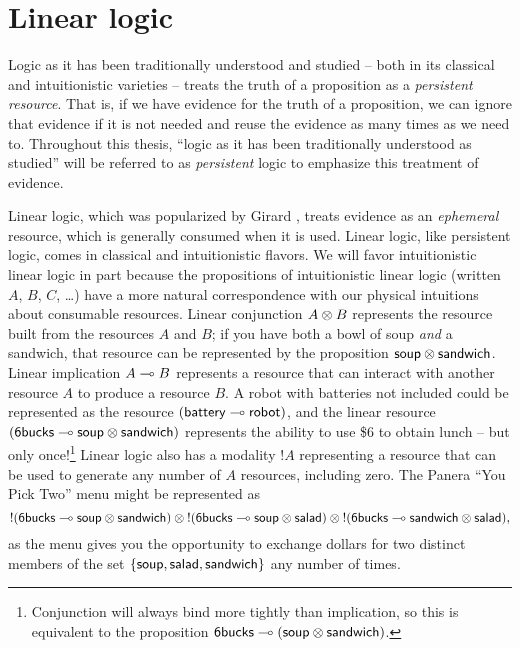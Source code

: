 
\chapter{Linear logic}

Logic as it has been traditionally understood and studied -- both in
its classical and intuitionistic varieties -- treats the truth of a
proposition as a {\it persistent resource}. That is, if we have
evidence for the truth of a proposition, we can ignore that evidence
if it is not needed and reuse the evidence as many times as we need
to. Throughout this thesis, ``logic as it has been traditionally
understood as studied'' will be referred to as {\it persistent} logic
to emphasize this treatment of evidence. 

Linear logic, which was popularized by Girard \cite{girard87linear},
treats evidence as an {\it ephemeral} resource, which is generally
consumed when it is used. Linear logic, like persistent logic, comes
in classical and intuitionistic flavors. We will favor intuitionistic
linear logic in part because the propositions of intuitionistic linear
logic (written $A$, $B$, $C$, \ldots) have a more natural
correspondence with our physical intuitions about consumable
resources. Linear conjunction $A \otimes B$ represents the resource
built from the resources $A$ and $B$; if you have both a bowl of soup
{\it and} a sandwich, that resource can be represented by the
proposition ${\sf soup} \otimes {\sf sandwich}$. Linear implication $A
\multimap B$ represents a resource that can interact with another
resource $A$ to produce a resource $B$. A robot with batteries not
included could be represented as the resource $({\sf battery} \multimap
{\sf robot})$, and the linear resource $({\sf 6bucks} \multimap {\sf
  soup} \otimes {\sf sandwich})$ represents the ability to use \$6 to
obtain lunch -- but only once!\footnote{Conjunction will always bind
  more tightly than implication, so this is equivalent to the
  proposition ${\sf 6bucks} \multimap ({\sf soup} \otimes {\sf
    sandwich})$.} Linear logic also has a modality ${!}A$ representing
a resource that can be used to generate any number of $A$ resources,
including zero. The Panera ``You Pick Two'' menu might be represented
as
\[ {!}({\sf 6bucks} \multimap {\sf soup} \otimes {\sf sandwich}) \otimes
{!}({\sf 6bucks} \multimap {\sf soup} \otimes {\sf salad}) \otimes
{!}({\sf 6bucks} \multimap {\sf sandwich} \otimes {\sf salad}),\] as the
menu gives you the opportunity to exchange dollars for two distinct
members of the set $\{ {\sf soup}, {\sf salad}, {\sf sandwich} \}$
any number of times.

